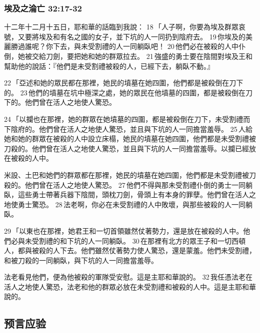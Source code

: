 \subsubsection{埃及之淪亡 32:17-32}
十二年十二月十五日，耶和華的話臨到我說： 18 「人子啊，你要為埃及群眾哀號，又要將埃及和有名之國的女子，並下坑的人一同扔到陰府去。 19 你埃及的美麗勝過誰呢？你下去，與未受割禮的人一同躺臥吧！ 20 他們必在被殺的人中仆倒，她被交給刀劍，要把她和她的群眾拉去。 21 強盛的勇士要在陰間對埃及王和幫助他的說話：『他們是未受割禮被殺的人，已經下去，躺臥不動。』

22 「亞述和她的眾民都在那裡，她民的墳墓在她四圍，他們都是被殺倒在刀下的。 23 他們的墳墓在坑中極深之處，她的眾民在他墳墓的四圍，都是被殺倒在刀下的。他們曾在活人之地使人驚恐。

24 「以攔也在那裡，她的群眾在她墳墓的四圍，都是被殺倒在刀下，未受割禮而下陰府的。他們曾在活人之地使人驚恐，並且與下坑的人一同擔當羞辱。 25 人給她和她的群眾在被殺的人中設立床榻，她民的墳墓在她四圍，他們都是未受割禮被刀殺的。他們曾在活人之地使人驚恐，並且與下坑的人一同擔當羞辱。以攔已經放在被殺的人中。

米設、土巴和她們的群眾都在那裡，她民的墳墓在她四圍，他們都是未受割禮被刀殺的。他們曾在活人之地使人驚恐。 27 他們不得與那未受割禮仆倒的勇士一同躺臥，這些勇士帶著兵器下陰間，頭枕刀劍，骨頭上有本身的罪孽。他們曾在活人之地使勇士驚恐。 28 法老啊，你必在未受割禮的人中敗壞，與那些被殺的人一同躺臥。

29 「以東也在那裡，她君王和一切首領雖然仗著勢力，還是放在被殺的人中。他們必與未受割禮的和下坑的人一同躺臥。 30 在那裡有北方的眾王子和一切西頓人，都與被殺的人下去。他們雖然仗著勢力使人驚恐，還是蒙羞。他們未受割禮，和被刀殺的一同躺臥，與下坑的人一同擔當羞辱。

法老看見他們，便為他被殺的軍隊受安慰。這是主耶和華說的。 32 我任憑法老在活人之地使人驚恐，法老和他的群眾必放在未受割禮和被殺的人中。這是主耶和華說的。

\subsection{预言应验}
